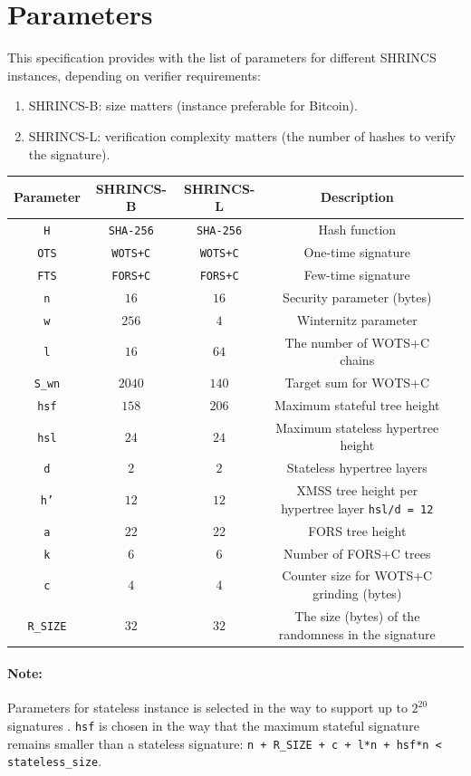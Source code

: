 \section{Parameters}
This specification provides with the list of parameters for different SHRINCS instances, depending on verifier requirements:
\begin{enumerate}
    \item SHRINCS-B: size matters (instance preferable for Bitcoin).
    \item SHRINCS-L: verification complexity matters (the number of hashes to verify the signature).
\end{enumerate}

\begin{center}
\begin{tabular}{ c c c c c}
 Parameter & SHRINCS-B & SHRINCS-L & Description \\ 
 \hline
 \texttt{H} & \texttt{SHA-256} & \texttt{SHA-256} & Hash function \\ 
 \texttt{OTS} & \texttt{WOTS+C} & \texttt{WOTS+C} & One-time signature \\ 
 \texttt{FTS} & \texttt{FORS+C} & \texttt{FORS+C} & Few-time signature \\ 
 \texttt{n} & $16$ & $16$ & Security parameter (bytes) \\  
 \texttt{w} & $256$ & $4$ & Winternitz parameter \\
 \texttt{l}  & $16$ & $64$ & The number of WOTS+C chains \\
 \texttt{S\_wn} & $2040$ & $140$ & Target sum for WOTS+C \\
 \texttt{hsf} & $158$ & $206$ & Maximum stateful tree height \\
 \texttt{hsl} & $24$ & $24$ & Maximum stateless hypertree height \\
 \texttt{d} & $2$ & $2$ & Stateless hypertree layers \\
 \texttt{h'} & $12$ & $12$ & XMSS tree height per hypertree layer \texttt{hsl/d = 12} \\
 \texttt{a} & $22$ & $22$ & FORS tree height \\ 
 \texttt{k} & $6$ & $6$ & Number of FORS+C trees \\
 \texttt{c} & $4$ & $4$ & Counter size for WOTS+C grinding (bytes) \\
 \texttt{R\_SIZE} & $32$ & $32$ & The size (bytes) of the randomness in the signature \\
\end{tabular}
\end{center}

\paragraph{Note:} Parameters for stateless instance is selected in the way to support up to $2^{20}$ signatures \cite{kudinov_nick_2025_hbs_bitcoin}. \texttt{hsf} is chosen in the way that the maximum stateful signature remains smaller than a stateless signature: \texttt{n + R\_SIZE + c + l*n + hsf*n < stateless\_size}.